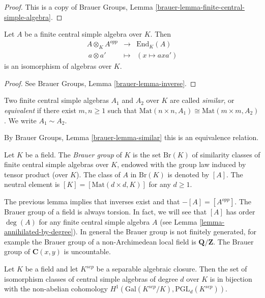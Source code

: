 \begin{proof}
This is a copy of
Brauer Groups, Lemma \ref{brauer-lemma-finite-central-simple-algebra}.
\end{proof}

\begin{lemma}
\label{lemma-brauer-inverse}
Let $A$ be a finite central simple algebra over $K$. Then
$$
\begin{matrix}
A \otimes_K A^{opp} & \longrightarrow & \text{End}_K(A) \\
\ a \otimes a' & \longmapsto & (x \mapsto a x a')
\end{matrix}
$$
is an isomorphism of algebras over $K$.
\end{lemma}

\begin{proof}
See
Brauer Groups, Lemma \ref{brauer-lemma-inverse}.
\end{proof}

\begin{definition}
\label{definition-brauer-equivalent}
Two finite central simple algebras $A_1$ and $A_2$ over $K$ are called
{\it similar}, or {\it equivalent} if there exist $m, n \geq 1$
such that $\text{Mat}(n \times n, A_1)
\cong \text{Mat}(m \times m, A_2)$. We write $A_1 \sim A_2$.
\end{definition}

\noindent
By Brauer Groups, Lemma \ref{brauer-lemma-similar} this is an
equivalence relation.

\begin{definition}
\label{definition-brauer-group}
Let $K$ be a field. The {\it Brauer group} of $K$ is the set $\text{Br} (K)$
of similarity classes of finite central simple algebras over $K$, endowed with
the group law induced by tensor product (over $K$). The class of $A$ in
$\text{Br}(K)$ is denoted by $[A]$. The neutral element is
$[K] = [\text{Mat}(d \times d, K)]$ for any $d \geq 1$.
\end{definition}

\noindent
The previous lemma implies that inverses exist and that $-[A] = [A^{opp}]$.
The Brauer group of a field is always torsion.
In fact, we will see that $[A]$ has order $\deg(A)$
for any finite central simple algebra $A$ (see
Lemma \ref{lemma-annihilated-by-degree}).
In general the Brauer group is not finitely generated, for example
the Brauer group of a non-Archimedean local field is $\mathbf{Q}/\mathbf{Z}$.
The Brauer group of $\mathbf{C}(x, y)$ is uncountable.

\begin{lemma}
\label{lemma-central-simple-algebra-pgln}
Let $K$ be a field and let $K^{sep}$ be a separable algebraic closure.
Then the set of isomorphism classes of central simple algebras of degree
$d$ over $K$ is in bijection with the non-abelian cohomology
$H^1(\text{Gal}(K^{sep}/K), \text{PGL}_d(K^{sep}))$.
\end{lemma}

